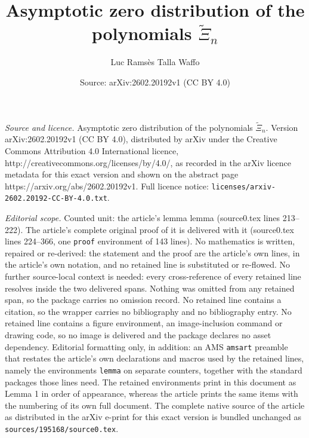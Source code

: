 \documentclass[10pt,a4paper]{amsart}
\title{Asymptotic zero distribution of the polynomials $\widetilde{\Xi}_n$}
\author{Luc Rams\`es Talla Waffo}
\date{Source: arXiv:2602.20192v1 (CC BY 4.0)}
\newtheorem{lemma}{Lemma}
\begin{document}
\maketitle

\noindent\emph{Source and licence.} Asymptotic zero distribution of the polynomials $\widetilde{\Xi}_n$. Version arXiv:2602.20192v1 (CC BY 4.0), distributed by arXiv under the Creative Commons Attribution 4.0 International licence, http://creativecommons.org/licenses/by/4.0/, as recorded in the arXiv licence metadata for this exact version and shown on the abstract page https://arxiv.org/abs/2602.20192v1. Full licence notice: \texttt{licenses/arxiv-2602.20192-CC-BY-4.0.txt}.\par\smallskip

\noindent\textit{Editorial scope.} Counted unit: the article's lemma lemma (source0.tex lines 213--222). The article's complete original proof of it is delivered with it (source0.tex lines 224--366, one \texttt{proof} environment of 143 lines). No mathematics is written, repaired or re-derived: the statement and the proof are the article's own lines, in the article's own notation, and no retained line is substituted or re-flowed.  No further source-local context is needed: every cross-reference of every retained line resolves inside the two delivered spans.  Nothing was omitted from any retained span, so the package carries no omission record.  No retained line contains a citation, so the wrapper carries no bibliography and no bibliography entry.  No retained line contains a figure environment, an image-inclusion command or drawing code, so no image is delivered and the package declares no asset dependency.  Editorial formatting only, in addition: an AMS \texttt{amsart} preamble that restates the article's own declarations and macros used by the retained lines, namely the environments \texttt{lemma} on separate counters, together with the standard packages those lines need.  The retained environments print in this document as Lemma 1 in order of appearance, whereas the article prints the same items with the numbering of its own full document.  The complete native source of the article as distributed in the arXiv e-print for this exact version is bundled unchanged as \texttt{sources/195168/source0.tex}.
\end{document}
